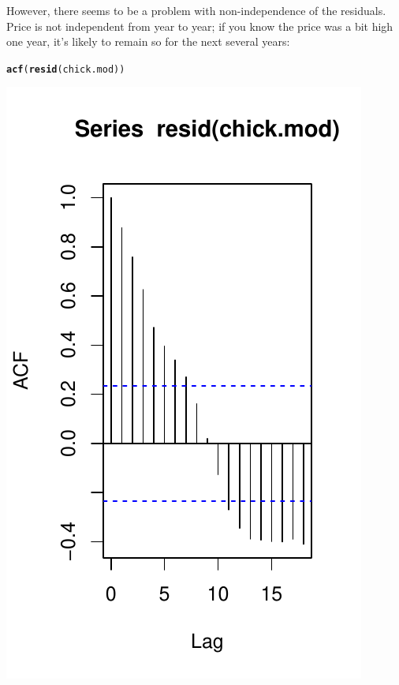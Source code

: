 \documentclass[twoside]{book}\usepackage[]{graphicx}\usepackage[]{xcolor}
\makeatletter
\def\maxwidth{ %
  \ifdim\Gin@nat@width>\linewidth
    \linewidth
  \else
    \Gin@nat@width
  \fi
}
\newcommand{\hlstd}[1]{\textcolor[rgb]{0.345,0.345,0.345}{#1}}%
\newcommand{\hlkwd}[1]{\textcolor[rgb]{0.737,0.353,0.396}{\textbf{#1}}}%
\newenvironment{kframe}{%
 \def\at@end@of@kframe{}%
 \ifinner\ifhmode%
  \def\at@end@of@kframe{\end{minipage}}%
  \begin{minipage}{\columnwidth}%
 \fi\fi%
 \def\FrameCommand##1{\hskip\@totalleftmargin \hskip-\fboxsep
 \colorbox{shadecolor}{##1}\hskip-\fboxsep
     \hskip-\linewidth \hskip-\@totalleftmargin \hskip\columnwidth}%
 \MakeFramed {\advance\hsize-\width
   \@totalleftmargin\z@ \linewidth\hsize
   \@setminipage}}%
 {\par\unskip\endMakeFramed%
 \at@end@of@kframe}
\newenvironment{knitrout}{}{} %
\makeatother
\begin{document}
However, there seems to be a problem with non-independence of the residuals.  Price is not independent from year to year; if you know the price was a bit high one year, it's likely to remain so for the next several years:
\begin{knitrout}
\color{fgcolor}\begin{kframe}
\begin{alltt}
\hlkwd{acf}\hlstd{(}\hlkwd{resid}\hlstd{(chick.mod))}
\end{alltt}
\end{kframe}

{\centering \includegraphics[width=\maxwidth]{figures/fig-chick-acf-1} 

}



\end{knitrout}
\end{document}
